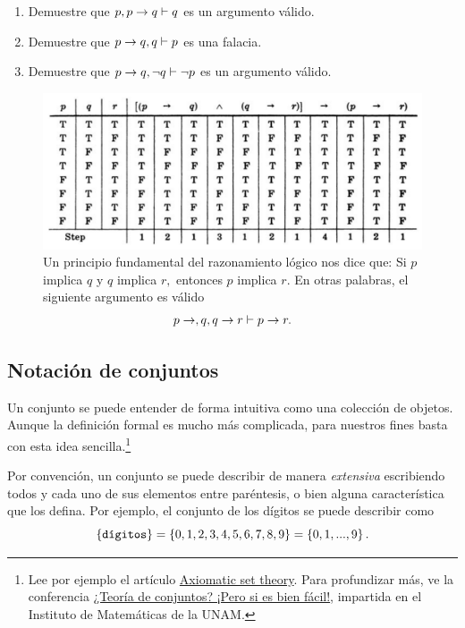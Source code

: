 \begin{resuelto}
 \label{lip:exmp:4.4}
  \begin{enumerate}
   \item Demuestre que $p, p\rightarrow q \vdash q$ es un argumento válido.
   \item Demuestre que $p\rightarrow q, q \vdash p$ es una falacia.

   \item Demuestre que $p\rightarrow q, \neg q \vdash \neg p$ es un argumento válido.
  \end{enumerate}

 \end{resuelto}

	\begin{figure}
		\centering
		\includegraphics[width=0.7\linewidth]{md/tabla_silogismo}
		\caption{
			  Un principio fundamental del razonamiento lógico nos dice que:
				Si $p$ implica $q$ y $q$ implica $r,$ entonces $p$ implica $r.$
			En otras palabras, el siguiente argumento es válido
			$$
			p\rightarrow,q, q\rightarrow r \vdash p \rightarrow r.
			$$ }
		\label{fig:tabla_silogismo}
	\end{figure}

\subsection{Notación de conjuntos}

Un conjunto se puede entender de forma intuitiva como una colección de objetos. Aunque la definición formal es mucho más complicada, para nuestros fines basta con esta idea sencilla.\footnote{Lee por ejemplo el artículo \href{https://www.britannica.com/science/set-theory/Axiomatic-set-theory}{Axiomatic set theory}. Para profundizar más, ve la conferencia \href{https://youtu.be/hLFit88zTYk}{¿Teoría de conjuntos? ¡Pero si es bien fácil!}, impartida en el Instituto de Matemáticas de la UNAM.}

Por convención, un conjunto se puede describir de manera \emph{extensiva} escribiendo todos y cada uno de sus elementos entre paréntesis, o bien alguna característica que los defina. Por ejemplo, el conjunto de los dígitos se puede describir como
\[
	\left\{ \texttt{dígitos} \right\}=\left\{ 0,1,2,3,4,5,6,7,8,9 \right\}=\left\{ 0,1,...,9 \right\}.
\]

